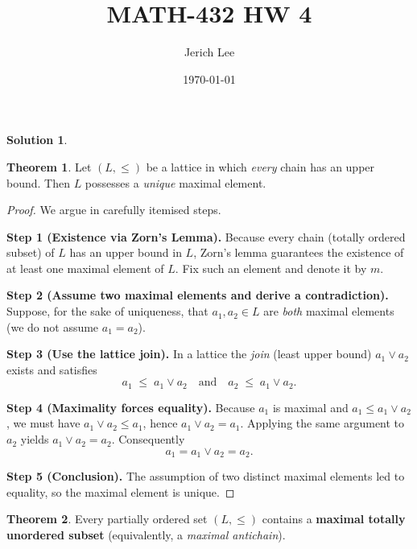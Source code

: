 \documentclass[12pt]{article}
\title{MATH-432 HW 4}
\author{Jerich Lee}
\date{\today}
\theoremstyle{definition} %
\newtheorem{solution}{Solution}
\newtheorem{theorem}{Theorem}
\theoremstyle{plain} %
\begin{document}
\maketitle

\begin{solution}
  \begin{theorem}
    Let $(L,\le)$ be a lattice in which \emph{every} chain has an upper bound.
    Then $L$ possesses a \emph{unique} maximal element.
    \end{theorem}
    
    \begin{proof}
    We argue in carefully itemised steps.
    
    \medskip
    \textbf{Step 1 (Existence via Zorn’s Lemma).}
    Because every chain (totally ordered subset) of $L$ has an upper bound
    in $L$, Zorn’s lemma guarantees the existence of at least one maximal
    element of $L$.
    Fix such an element and denote it by $m$.
    
    \medskip
    \textbf{Step 2 (Assume two maximal elements and derive a contradiction).}
    Suppose, for the sake of uniqueness, that $a_1,a_2\in L$ are \emph{both}
    maximal elements (we do not assume $a_1=a_2$).
    
    \medskip
    \textbf{Step 3 (Use the lattice join).}
    In a lattice the \emph{join} (least upper bound) $a_1\vee a_2$ exists
    and satisfies
    \[
      a_1\;\le\;a_1\vee a_2
      \quad\text{and}\quad
      a_2\;\le\;a_1\vee a_2.
    \]
    
    \medskip
    \textbf{Step 4 (Maximality forces equality).}
    Because $a_1$ is maximal and $a_1\le a_1\vee a_2$, we must have
    $a_1\vee a_2\le a_1$, hence $a_1\vee a_2=a_1$.
    Applying the same argument to $a_2$ yields $a_1\vee a_2=a_2$.
    Consequently
    \[
      a_1 = a_1\vee a_2 = a_2.
    \]
    
    \medskip
    \textbf{Step 5 (Conclusion).}
    The assumption of two distinct maximal elements led to equality,
    so the maximal element is unique.
    \end{proof}
    \begin{theorem}
      \label{thm:maximal-antichain}
      Every partially ordered set $(L,\le)$ contains a \textbf{maximal
      totally unordered subset} (equivalently, a \emph{maximal antichain}).
      \end{theorem}
      
\end{solution}
\end{document}
